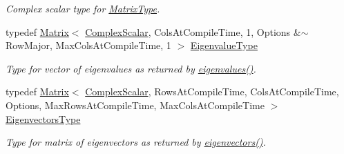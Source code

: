 \begin{DoxyCompactItemize}
\begin{DoxyCompactList}\small\item\em Complex scalar type for \mbox{\hyperlink{class_eigen_1_1_eigen_solver_a83acd180404ddaac8a678fa65a6b632b}{Matrix\+Type}}. \end{DoxyCompactList}\item 
typedef \mbox{\hyperlink{class_eigen_1_1_matrix}{Matrix}}$<$ \mbox{\hyperlink{class_eigen_1_1_eigen_solver_a4d0b2a773357d0a6ec98e026f04002ed}{Complex\+Scalar}}, Cols\+At\+Compile\+Time, 1, Options \&$\sim$Row\+Major, Max\+Cols\+At\+Compile\+Time, 1 $>$ \mbox{\hyperlink{class_eigen_1_1_eigen_solver_adc446bcb60572758fa64515f2825db62}{Eigenvalue\+Type}}
\begin{DoxyCompactList}\small\item\em Type for vector of eigenvalues as returned by \mbox{\hyperlink{class_eigen_1_1_eigen_solver_a114189009e42f5e03372a7a3dfa33b97}{eigenvalues()}}. \end{DoxyCompactList}\item 
typedef \mbox{\hyperlink{class_eigen_1_1_matrix}{Matrix}}$<$ \mbox{\hyperlink{class_eigen_1_1_eigen_solver_a4d0b2a773357d0a6ec98e026f04002ed}{Complex\+Scalar}}, Rows\+At\+Compile\+Time, Cols\+At\+Compile\+Time, Options, Max\+Rows\+At\+Compile\+Time, Max\+Cols\+At\+Compile\+Time $>$ \mbox{\hyperlink{class_eigen_1_1_eigen_solver_aa140354e2f7d5ce34c6488c39e19f2c2}{Eigenvectors\+Type}}
\begin{DoxyCompactList}\small\item\em Type for matrix of eigenvectors as returned by \mbox{\hyperlink{class_eigen_1_1_eigen_solver_a66288022802172e3ee059283b26201d7}{eigenvectors()}}. \end{DoxyCompactList}\end{DoxyCompactItemize}
